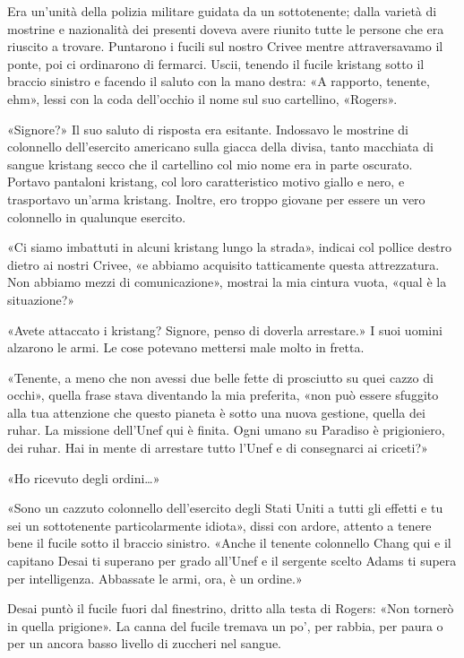 Era un'unità della polizia militare guidata da un sottotenente; dalla
varietà di mostrine e nazionalità dei presenti doveva avere riunito
tutte le persone che era riuscito a trovare. Puntarono i fucili sul
nostro Crivee mentre attraversavamo il ponte, poi ci ordinarono di
fermarci. Uscii, tenendo il fucile kristang sotto il braccio sinistro e
facendo il saluto con la mano destra: «A rapporto, tenente, ehm», lessi
con la coda dell'occhio il nome sul suo cartellino, «Rogers».

«Signore?» Il suo saluto di risposta era esitante. Indossavo le mostrine
di colonnello dell'esercito americano sulla giacca della divisa, tanto
macchiata di sangue kristang secco che il cartellino col mio nome era in
parte oscurato. Portavo pantaloni kristang, col loro caratteristico
motivo giallo e nero, e trasportavo un'arma kristang. Inoltre, ero
troppo giovane per essere un vero colonnello in qualunque esercito.

«Ci siamo imbattuti in alcuni kristang lungo la strada», indicai col
pollice destro dietro ai nostri Crivee, «e abbiamo acquisito
tatticamente questa attrezzatura. Non abbiamo mezzi di comunicazione»,
mostrai la mia cintura vuota, «qual è la situazione?»

«Avete attaccato i kristang? Signore, penso di doverla arrestare.» I
suoi uomini alzarono le armi. Le cose potevano mettersi male molto in
fretta.

«Tenente, a meno che non avessi due belle fette di prosciutto su quei
cazzo di occhi», quella frase stava diventando la mia preferita, «non
può essere sfuggito alla tua attenzione che questo pianeta è sotto una
nuova gestione, quella dei ruhar. La missione dell'Unef qui è finita.
Ogni umano su Paradiso è prigioniero, dei ruhar. Hai in mente di
arrestare tutto l'Unef e di consegnarci ai criceti?»

«Ho ricevuto degli ordini\ldots»

«Sono un cazzuto colonnello dell'esercito degli Stati Uniti a tutti gli
effetti e tu sei un sottotenente particolarmente idiota», dissi con
ardore, attento a tenere bene il fucile sotto il braccio sinistro.
«Anche il tenente colonnello Chang qui e il capitano Desai ti superano
per grado all'Unef e il sergente scelto Adams ti supera per
intelligenza. Abbassate le armi, ora, è un ordine.»

Desai puntò il fucile fuori dal finestrino, dritto alla testa di Rogers:
«Non tornerò in quella prigione». La canna del fucile tremava un po',
per rabbia, per paura o per un ancora basso livello di zuccheri nel
sangue.

